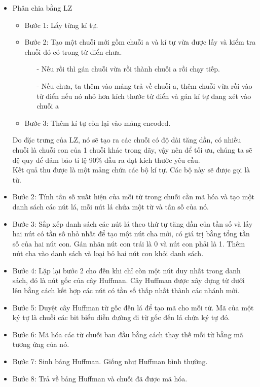         \begin{itemize}
            \item {Phân chia bằng LZ}
    
            \begin{itemize}
                \item Bước 1: Lấy từng kí tự.
                \item Bước 2: Tạo một chuỗi mới gồm chuỗi a và kí tự vừa được lấy và kiểm tra chuỗi đó có trong từ điển chưa.
                    \begin{itemize}
                        \item[-] Nếu rồi thì gán chuỗi vừa rồi thành chuỗi a rồi chạy tiếp.
                        \item[-] Nếu chưa, ta thêm vào mảng trả về chuỗi a, thêm chuỗi vừa rồi vào từ điển nếu nó nhỏ hơn kích thước từ điển và gán kí tự đang xét vào chuỗi a
                    \end{itemize}
                \item Bước 3: Thêm kí tự còn lại vào mảng encoded.
            \end{itemize}
            Do đặc trưng của LZ, nó sẽ tạo ra các chuỗi có độ dài tăng dần, có nhiều chuỗi là chuỗi con của 1 chuỗi khác trong dãy, vậy nên để tối ưu, chúng ta sẽ đệ quy để đảm bảo tỉ lệ 90\% đầu ra đạt kích thước yêu cầu. \\
            Kết quả thu được là một mảng chứa các bộ kí tự. Các bộ này sẽ được gọi là từ.
            \item Bước 2: Tính tần số xuất hiện của mỗi từ trong chuỗi cần mã hóa và tạo một danh sách các nút lá, mỗi nút lá chứa một từ và tần số của nó.
            \item Bước 3: Sắp xếp danh sách các nút lá theo thứ tự tăng dần của tần số và lấy hai nút có tần số nhỏ nhất để tạo một nút cha mới, có giá trị bằng tổng tần số của hai nút con. Gán nhãn nút con trái là 0 và nút con phải là 1. Thêm nút cha vào danh sách và loại bỏ hai nút con khỏi danh sách.
            \item Bước 4: Lặp lại bước 2 cho đến khi chỉ còn một nút duy nhất trong danh sách, đó là nút gốc của cây Huffman. Cây Huffman được xây dựng từ dưới lên bằng cách kết hợp các nút có tần số thấp nhất thành các nhánh mới.
            \item Bước 5: Duyệt cây Huffman từ gốc đến lá để tạo mã cho mỗi từ. Mã của một ký tự là chuỗi các bit biểu diễn đường đi từ gốc đến lá chứa ký tự đó.
            \item Bước 6: Mã hóa các từ chuỗi ban đầu bằng cách thay thế mỗi từ bằng mã tương ứng của nó. 
            \item Bước 7: Sinh bảng Huffman. Giống như Huffman bình thường.
            \item Bước 8: Trả về bảng Huffman và chuỗi đã được mã hóa.
        \end{itemize}
